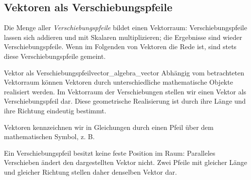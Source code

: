\subsection{Vektoren als Verschiebungspfeile}
\label{subsec:vector_algebra_vectors_as_displacements}

Die Menge aller \emph{Verschiebungspfeile} 
bildet einen Vektorraum: Verschiebungspfeile lassen sich addieren und mit
Skalaren multiplizieren; die Ergebnisse sind wieder Verschiebungspfeile. Wenn
im Folgenden von Vektoren die Rede ist, sind stets diese Verschiebungspfeile
gemeint.

\begin{DefinitionBox}{Vektor als Verschiebungspfeil}{vector_algebra_vector}
  Abhängig vom betrachteten Vektorraum können Vektoren durch unterschiedliche
  mathematische Objekte realisiert werden. Im Vektorraum der Verschiebungen
  stellen wir einen Vektor als Verschiebungspfeil dar. Diese geometrische
  Realisierung ist durch ihre Länge und ihre Richtung eindeutig bestimmt.

  Vektoren kennzeichnen wir in Gleichungen durch einen Pfeil über dem
  mathematischen Symbol, z. B.
  \begin{center}
  \end{center}
  Ein Verschiebungspfeil besitzt keine feste Position im Raum: Paralleles
  Verschieben ändert den dargestellten Vektor nicht. Zwei Pfeile mit gleicher
  Länge und gleicher Richtung stellen daher denselben Vektor dar.
  \par\smallskip
  \centering
  \par
\end{DefinitionBox}


